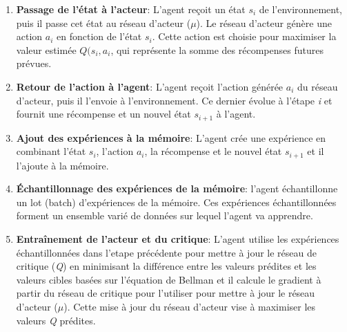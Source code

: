 \begin{enumerate}
    \item \textbf{Passage de l'état à l'acteur}: L'agent reçoit un état $s_i$ de l'environnement, puis il passe cet état au réseau d'acteur ($\mu$). Le réseau d'acteur génère une action $a_i$ en fonction de l'état $s_i$. Cette action est choisie pour maximiser la valeur estimée $Q(s_i, a_i$, qui représente la somme des récompenses futures prévues.
    \item \textbf{Retour de l'action à l'agent}: L'agent reçoit l'action générée $a_i$ du réseau d'acteur, puis il l'envoie à l'environnement. Ce dernier évolue à l'étape \textit{i} et fournit une récompense et un nouvel état $s_{i+1}$ à l'agent.
    \item \textbf{Ajout des expériences à la mémoire}: L'agent crée une expérience en combinant l'état $s_i$, l'action $a_i$, la récompense et le nouvel état $s_{i+1}$ et il l'ajoute à la mémoire.
    \item \textbf{Échantillonnage des expériences de la mémoire}: l'agent échantillonne un lot (batch) d'expériences de la mémoire. Ces expériences échantillonnées forment un ensemble varié de données sur lequel l'agent va apprendre.
    \item \textbf{Entraînement de l'acteur et du critique}: L'agent utilise les expériences échantillonnées dans l'etape précédente pour mettre à jour le réseau de critique (\textit{Q}) en minimisant la différence entre les valeurs prédites et les valeurs cibles basées sur l'équation de Bellman et il calcule le gradient à partir du réseau de critique pour l'utiliser pour mettre à jour le réseau d'acteur ($\mu$). Cette mise à jour du réseau d'acteur vise à maximiser les valeurs \textit{Q} prédites.
\end{enumerate}



